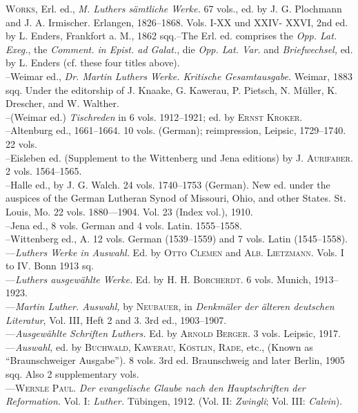 \textsc{Works,} Erl. ed., \textit{M. Luthers sämtliche Werke.} 67 vols., ed. by J. G. Plochmann
and J. A. Irmischer. Erlangen, 1826--1868. Vols. I-XX und XXIV-
XXVI, 2nd ed. by L. Enders, Frankfort a. M., 1862 sqq.--The Erl. ed.
comprises the \textit{Opp. Lat. Exeg.}, the \textit{Comment. in Epist. ad Galat.}, die \textit{Opp.
Lat. Var.} and \textit{Briefwechsel,} ed. by L. Enders (cf. these four titles above). \\
--Weimar ed., \textit{Dr. Martin Luthers Werke. Kritische Gesamtausgabe.} Weimar,
1883 sqq. Under the editorship of J. Knaake, G. Kawerau, P. Pietsch,
N. Müller, K. Drescher, and W. Walther. \\
--(Weimar ed.) \textit{Tischreden} in 6 vols. 1912--1921; ed. by \textsc{Ernst Kroker.} \\
--Altenburg ed., 1661--1664. 10 vols. (German); reimpression, Leipsic,
1729--1740. 22 vols. \\
--Eisleben ed. (Supplement to the Wittenberg und Jena editions) by \textsc{J.
Aurifaber.} 2 vols. 1564--1565. \\
--Halle ed., by J. G. Walch. 24 vols. 1740--1753 (German). New ed.
under the auspices of the German Lutheran Synod of Missouri, Ohio, and
other States. St. Louis, Mo. 22 vols. 1880---1904. Vol. 23 (Index vol.),
1910. \\
--Jena ed., 8 vols. German and 4 vols. Latin. 1555--1558. \\
--Wittenberg ed., A. 12 vols. German (1539--1559) and 7 vols. Latin
(1545--1558). \\
---\textit{Luthers Werke in Auswahl.} Ed. by \textsc{Otto Clemen} and \textsc{Alb. Lietzmann.}
Vols. I to IV. Bonn 1913 sq. \\
---\textit{Luthers ausgewählte Werke.} Ed. by \textsc{H. H. Borcherdt.} 6 vols. Munich,
1913--1923. \\
---\textit{Martin Luther. Auswahl,} by \textsc{Neubauer}, in \textit{Denkmäler der älteren
deutschen Literatur}, Vol. III, Heft 2 and 3. 3rd ed., 1903--1907. \\
---\textit{Ausgewählte Schriften Luthers.} Ed. by \textsc{Arnold Berger.} 3 vols. Leipsic,
1917. \\
---\textit{Auswahl,} ed. by \textsc{Buchwald, Kawerau, Köstlin, Rade,} etc., (Known
as “Braunschweiger Ausgabe”). 8 vols. 3rd ed. Braunschweig and later
Berlin, 1905 sqq. Also 2 supplementary vols. \\
---\textsc{Wernle Paul.} \textit{Der evangelische Glaube nach den Hauptschriften der Reformation.}
Vol. I: \textit{Luther.} Tübingen, 1912. (Vol. II: \textit{Zwingli}; Vol. III:
\textit{Calvin}).


